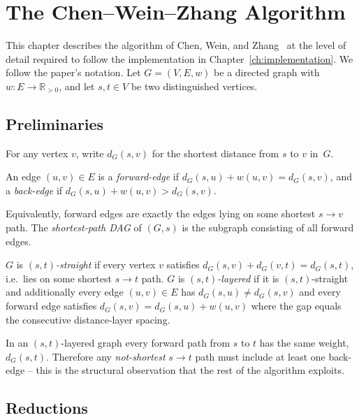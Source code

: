 \chapter{The Chen--Wein--Zhang Algorithm}
\label{ch:algorithm}

This chapter describes the algorithm of Chen, Wein, and
Zhang~\cite{ChenWeinZhang2025} at the level of detail required to follow the
implementation in Chapter~\ref{ch:implementation}. We follow the paper's
notation. Let $G=(V,E,w)$ be a directed graph with $w:E\to\mathbb{R}_{>0}$,
and let $s,t\in V$ be two distinguished vertices.

\section{Preliminaries}

For any vertex $v$, write $d_G(s,v)$ for the shortest distance from $s$ to
$v$ in~$G$.

\begin{definition}
An edge $(u,v)\in E$ is a \emph{forward-edge} if
$d_G(s,u)+w(u,v)=d_G(s,v)$, and a \emph{back-edge} if
$d_G(s,u)+w(u,v)>d_G(s,v)$.
\end{definition}

Equivalently, forward edges are exactly the edges lying on some shortest
$s\to v$ path. The \emph{shortest-path DAG} of $(G,s)$ is the subgraph
consisting of all forward edges.

\begin{definition}
$G$ is \emph{$(s,t)$-straight} if every vertex $v$ satisfies
$d_G(s,v)+d_G(v,t)=d_G(s,t)$, i.e.~lies on some shortest $s\to t$ path. $G$
is \emph{$(s,t)$-layered} if it is $(s,t)$-straight and additionally every
edge $(u,v)\in E$ has $d_G(s,u)\neq d_G(s,v)$ and every forward edge satisfies
$d_G(s,v) = d_G(s,u)+w(u,v)$ where the gap equals the consecutive
distance-layer spacing.
\end{definition}

In an $(s,t)$-layered graph every forward path from $s$ to $t$ has the same
weight, $d_G(s,t)$. Therefore any \emph{not-shortest} $s\to t$ path must
include at least one back-edge -- this is the structural observation that
the rest of the algorithm exploits.

\section{Reductions}

